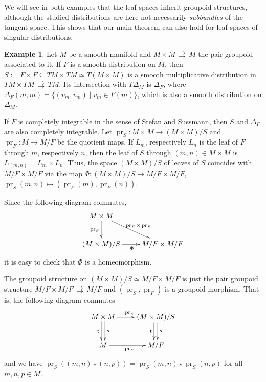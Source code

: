 \documentclass{amsart}
\theoremstyle{definition}
\newtheorem{example}[theorem]{Example}
\begin{document}
We will see in both examples that the leaf spaces inherit groupoid structures, although the studied
distributions are here not necessarily \emph{subbundles} of the tangent space. 
This shows that our main theorem can also
hold for leaf spaces of singular distributions.
\begin{example}\label{ex-basegp}  
Let $M$ be a smooth manifold and $M\times M\,{{\rightrightarrows}}\,M$ the pair groupoid associated to it. 
If $F$ is a smooth distribution on $M$, then 
$S:=F\times F\subseteq TM\times TM\simeq T(M\times M)$ is a
smooth multiplicative distribution in $TM\times TM\,{{\rightrightarrows}} \,TM$. Its intersection
with $T\Delta_M$ is $\Delta_{F}$, 
where $\Delta_{F}(m,m)=\{(v_m,v_m)\mid v_m\in F(m)\}$, which is
also a smooth distribution on $\Delta_M$.

If $F$ is completely integrable in the sense of Stefan and Sussmann, 
then $S$ and $\Delta_{F}$ are also completely integrable.
Let $\operatorname{pr}_{S}:M\times M\to  (M\times M)/S$ and $\operatorname{pr}_{F}:M\to
M/F$ be  the quotient maps. If $L_m$, respectively
$L_n$ is the leaf of $F$ through $m$, respectively $n$, then 
the leaf of $S$ through
$(m,n)\in M\times M$ is $L_{(m,n)}=L_m\times L_n$. Thus, the space $(M\times M)/S$
of leaves of $S$  coincides with $M/F\times
M/F$ via the map $\Phi:(M\times M)/S\to M/F\times M/F$, 
$\operatorname{pr}_{S}(m,n)\mapsto (\operatorname{pr}_F(m), \operatorname{pr}_F(n))$.

Since 
the following diagram commutes, 
\begin{displaymath}
\begin{xy}
\xymatrix{
M\times M\ar[d]_{\operatorname{pr}_S}\ar[rd]^{\operatorname{pr}_F\times \operatorname{pr}_F}& \\
(M\times M)/S\ar[r]_\Phi&M/F\times M/F
}
\end{xy}
\end{displaymath}
it is easy to check that $\Phi$ is a homeomorphism.

The groupoid structure on $(M\times M)/S\simeq M/F\times M/F$ is just the pair groupoid structure
$M/F\times M/F\,{{\rightrightarrows}}\, M/F$ and $(\operatorname{pr}_S,\operatorname{pr}_F)$ is a groupoid morphism.
That is, the following diagram commutes
\begin{displaymath}
\begin{xy}
\xymatrix{
M\times M\ar[r]^{\operatorname{pr}_S}\ar@<.6ex>^{{\mathsf{s}}}[d]
\ar@<-.6ex>_{{\mathsf{t}}}[d]&(M\times M)/S
\ar@<.6ex>^{{\mathsf{s}}}[d]
\ar@<-.6ex>_{{\mathsf{t}}}[d]\\
M\ar[r]_{\operatorname{pr}_F}& M/F
}
\end{xy}
\end{displaymath}
and we have $\operatorname{pr}_S((m,n)\star(n,p))=\operatorname{pr}_S(m,n)\star\operatorname{pr}_S(n,p)$
for all $m,n,p\in M$.


\end{example}
\end{document}
